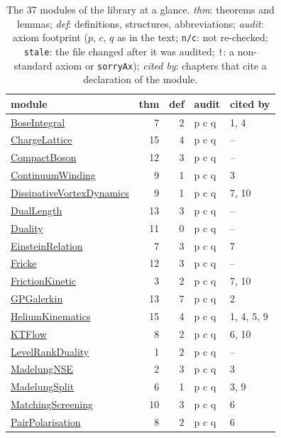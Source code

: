 \begin{table}[p]\centering\footnotesize\setlength{\tabcolsep}{3.2pt}
\caption{The 37 modules of the library at a glance. \emph{thm}: theorems and lemmas; \emph{def}: definitions, structures, abbreviations; \emph{audit}: axiom footprint ($p$, $c$, $q$ as in the text; \texttt{n/c}: not re-checked; \texttt{stale}: the file changed after it was audited; \texttt{!}: a non-standard axiom or \texttt{sorryAx}); \emph{cited by}: chapters that cite a declaration of the module.}\label{appA:tab-modules}
\begin{tabular}{@{}lrrll@{}}\toprule module & thm & def & audit & cited by \\\midrule
\hyperref[appA:BoseIntegral]{BoseIntegral} & 7 & 2 & p c q & 1, 4 \\
\hyperref[appA:ChargeLattice]{ChargeLattice} & 15 & 4 & p c q & -- \\
\hyperref[appA:CompactBoson]{CompactBoson} & 12 & 3 & p c q & -- \\
\hyperref[appA:ContinuumWinding]{ContinuumWinding} & 9 & 1 & p c q & 3 \\
\hyperref[appA:DissipativeVortexDynamics]{DissipativeVortexDynamics} & 9 & 1 & p c q & 7, 10 \\
\hyperref[appA:DualLength]{DualLength} & 13 & 3 & p c q & -- \\
\hyperref[appA:Duality]{Duality} & 11 & 0 & p c q & -- \\
\hyperref[appA:EinsteinRelation]{EinsteinRelation} & 7 & 3 & p c q & 7 \\
\hyperref[appA:Fricke]{Fricke} & 12 & 3 & p c q & -- \\
\hyperref[appA:FrictionKinetic]{FrictionKinetic} & 3 & 2 & p c q & 7, 10 \\
\hyperref[appA:GPGalerkin]{GPGalerkin} & 13 & 7 & p c q & 2 \\
\hyperref[appA:HeliumKinematics]{HeliumKinematics} & 15 & 4 & p c q & 1, 4, 5, 9 \\
\hyperref[appA:KTFlow]{KTFlow} & 8 & 2 & p c q & 6, 10 \\
\hyperref[appA:LevelRankDuality]{LevelRankDuality} & 1 & 2 & p c q & -- \\
\hyperref[appA:MadelungNSE]{MadelungNSE} & 2 & 3 & p c q & 3 \\
\hyperref[appA:MadelungSplit]{MadelungSplit} & 6 & 1 & p c q & 3, 9 \\
\hyperref[appA:MatchingScreening]{MatchingScreening} & 10 & 3 & p c q & 6 \\
\hyperref[appA:PairPolarisation]{PairPolarisation} & 8 & 2 & p c q & 6 \\

\end{tabular}
\end{table}

